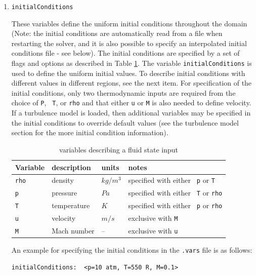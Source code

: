 \documentclass{article}
\begin{document}
\begin{enumerate}
\item {\tt initialConditions} 

  These variables define the uniform initial conditions throughout the
  domain (Note: the initial conditions are automatically read from a
  file when restarting the solver, and it is also possible to specify
  an interpolated initial conditions file - see below).  The initial
  conditions are specified by a set of flags and options as described
  in Table \ref{tab:fs}.  The variable {\tt initialConditions} is used
  to define the uniform initial values.  To describe initial
  conditions with different values in different regions, see the next
  item.  For specification of the initial conditions, only two
  thermodynamic inputs are required from the choice of {\tt P}, {\tt
    T}, or {\tt rho} and that either {\tt u} or {\tt M} is also needed
  to define velocity.  If a turbulence model is loaded, then
  additional variables may be specified in the initial conditions to
  override default values (see the turbulence model section for the
  more initial condition information).

\begin{table}[htbp]

  \begin{centering}
    \leavevmode
  \begin{tabular}{|l|l|l|l|}
    \hline
    Variable & description & units & notes \\
    \hline\hline
    {\tt rho}      & density     & $kg/m^3$ & specified with either {\tt
    p} or {\tt T} \\
    {\tt p}        & pressure    & $Pa$     & specified with either {\tt
    T}  or {\tt rho} \\
    {\tt T}        & temperature & $K$      & specified with either {\tt
    p}  or {\tt rho} \\
    {\tt u}        & velocity    & $m/s$    & exclusive with {\tt M} \\
    {\tt M}        & Mach number &  --    & exclusive with {\tt u} \\
    \hline
  \end{tabular}
\caption{variables describing a fluid state input}
  \label{tab:fs}
  \end{centering}
\end{table}

An example for specifying the initial conditions in the {\tt .vars} file is as follows:

\begin{verbatim}
initialConditions:  <p=10 atm, T=550 R, M=0.1>
\end{verbatim}


\end{enumerate}
\end{document}
